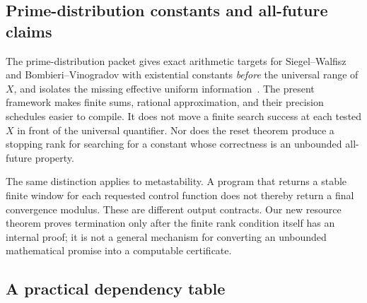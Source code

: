 \subsection{Prime-distribution constants and all-future claims}

The prime-distribution packet gives exact arithmetic targets for
Siegel--Walfisz and Bombieri--Vinogradov with existential constants
\emph{before} the universal range of \(X\), and isolates the missing
effective uniform information~\cite{repo-primes}. The present
framework makes finite sums, rational approximation, and their
precision schedules easier to compile. It does not move a finite
search success at each tested \(X\) in front of the universal
quantifier. Nor does the reset theorem produce a stopping rank for
searching for a constant whose correctness is an unbounded
all-future property.

The same distinction applies to metastability. A program that returns
a stable finite window for each requested control function does not
thereby return a final convergence modulus. These are different output
contracts. Our new resource theorem proves termination only after
the finite rank condition itself has an internal proof; it is not a
general mechanism for converting an unbounded mathematical promise
into a computable certificate.

\subsection{A practical dependency table}

